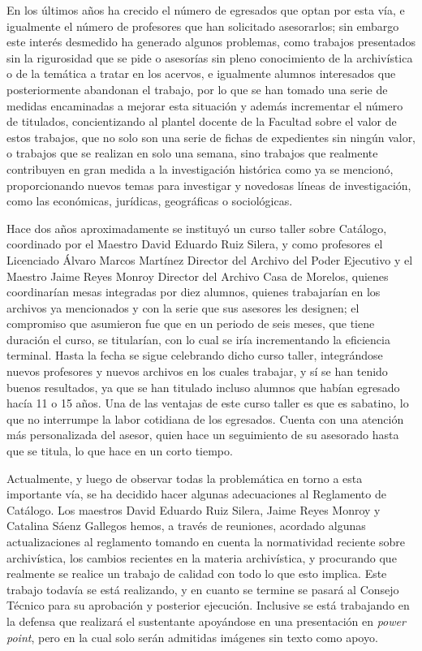 \enlargethispage{1\baselineskip}
En los últimos años ha crecido el número de egresados que optan por 
esta vía, e igualmente el número de profesores que han solicitado 
asesorarlos; sin embargo este interés desmedido ha generado algunos 
problemas, como trabajos presentados sin la rigurosidad que se pide o 
asesorías sin pleno conocimiento de la archivística o de la temática a 
tratar en los acervos, e igualmente alumnos interesados que 
posteriormente abandonan el trabajo, por lo que se han tomado una serie 
de medidas encaminadas a mejorar esta situación y además incrementar el 
número de titulados, concientizando al plantel docente de la Facultad 
sobre el valor de estos trabajos, que no solo son una serie de fichas de 
expedientes sin ningún valor, o trabajos que se realizan en solo una 
semana, sino trabajos que realmente contribuyen en gran medida a la 
investigación histórica como ya se mencionó, proporcionando nuevos temas 
para investigar y novedosas líneas de investigación, como las 
económicas, jurídicas, geográficas o sociológicas.

Hace dos años aproximadamente se instituyó un curso taller sobre Catálogo, 
coordinado por el Maestro David Eduardo Ruiz Silera, y como profesores 
el Licenciado Álvaro Marcos Martínez Director del Archivo del Poder 
Ejecutivo y el Maestro Jaime Reyes Monroy Director del Archivo Casa de 
Morelos, quienes coordinarían mesas integradas por diez alumnos, quienes 
trabajarían en los archivos ya mencionados y con la serie que 
sus asesores les designen; el compromiso que asumieron fue que en un 
periodo de seis meses, que tiene duración el curso, se titularían, con lo 
cual se iría incrementando la eficiencia terminal. Hasta la fecha se 
sigue celebrando dicho curso taller, integrándose nuevos profesores y 
nuevos archivos en los cuales trabajar, y sí se han tenido buenos 
resultados, ya que se han titulado incluso alumnos que habían egresado 
hacía 11 o 15 años. Una de las ventajas de este curso taller es que es 
sabatino, lo que no interrumpe la labor cotidiana de los egresados. 
Cuenta con una atención más personalizada del asesor, quien hace un 
seguimiento de su asesorado hasta que se titula, lo que hace en un corto 
tiempo.

Actualmente, y luego  de observar todas la problemática en torno a esta 
importante vía, se ha decidido hacer algunas adecuaciones al Reglamento de 
Catálogo. Los maestros David Eduardo Ruiz Silera, Jaime Reyes Monroy 
y Catalina Sáenz Gallegos hemos, a través de reuniones, 
acordado algunas actualizaciones al reglamento tomando en cuenta la 
normatividad reciente sobre archivística, los cambios recientes en la 
materia archivística, y procurando que realmente se realice un trabajo de calidad 
con todo lo que esto implica. Este trabajo todavía se está realizando, y 
en cuanto se termine se pasará al Consejo Técnico para su aprobación y 
posterior ejecución. Inclusive se está trabajando en la defensa que 
realizará el sustentante apoyándose en una presentación en {\it power 
point}, pero en la cual solo serán admitidas imágenes sin texto como 
apoyo.
\newpage

